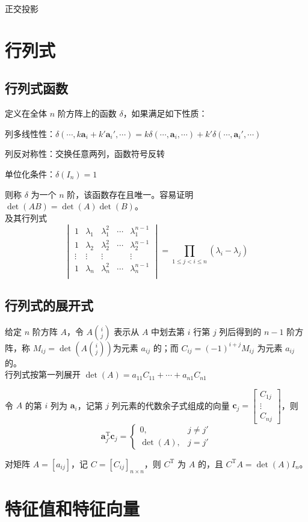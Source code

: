 \documentclass[./main.tex]{subfiles}
\begin{document}
正交投影

\section{行列式}
\subsection{行列式函数}
定义在全体 $n$ 阶方阵上的函数 $\delta$，如果满足如下性质：
\begin{enumerate*}
    \item 列多线性性：$\delta(\cdots,k\bm{a}_i+k'\bm{a}_i',\cdots)=k\delta(\cdots,\bm{a}_i,\cdots)+k'\delta(\cdots,\bm{a}_i',\cdots)$
    \item 列反对称性：交换任意两列，函数符号反转
    \item 单位化条件：$\delta(I_n)=1$
\end{enumerate*}
则称 $\delta$ 为一个 $n$ 阶，该函数存在且唯一。容易证明 $\det(AB)=\det(A)\det(B)$。\\

及其行列式
\begin{equation}
    \begin{vmatrix}
        1      & \lambda_1 & \lambda_1^2 & \cdots & \lambda_1^{n-1} \\
        1      & \lambda_2 & \lambda_2^2 & \cdots & \lambda_2^{n-1} \\
        \vdots & \vdots    & \vdots      &        & \vdots          \\
        1      & \lambda_n & \lambda_n^2 & \cdots & \lambda_n^{n-1} \\
    \end{vmatrix}=\prod_{1\le j<i\le n}(\lambda_i-\lambda_j)
\end{equation}

\subsection{行列式的展开式}
给定 $n$ 阶方阵 $A$，令 $A\binom{i}{j}$ 表示从 $A$ 中划去第 $i$ 行第 $j$ 列后得到的 $n-1$ 阶方阵，称 $M_{ij}=\det\left(A\binom{i}{j}\right)$为元素 $a_{ij}$ 的；而 $C_{ij}=(-1)^{i+j}M_{ij}$ 为元素 $a_{ij}$ 的。\\

行列式按第一列展开 $\det(A)=a_{11}C_{11}+\cdots+a_{n1}C_{n1}$

令 $A$ 的第 $i$ 列为 $\bm{a}_i$，记第 $j$ 列元素的代数余子式组成的向量 $\bm{c}_j=\begin{bmatrix}
        C_{1j} \\\vdots\\C_{nj}
    \end{bmatrix}$，则
\begin{equation}
    \bm{a}_{j'}^{\mathrm{T}}\bm{c}_j=\begin{cases}
        0,       & j\neq j' \\
        \det(A), & j=j'
    \end{cases}
\end{equation}

对矩阵 $A=[a_{ij}]$，记 $C=[C_{ij}]_{n\times n}$，则 $C^{\mathrm{T}}$ 为 $A$ 的，且 $C^{\mathrm{T}}A=\det(A)I_n$。

\section{特征值和特征向量}
\end{document}
